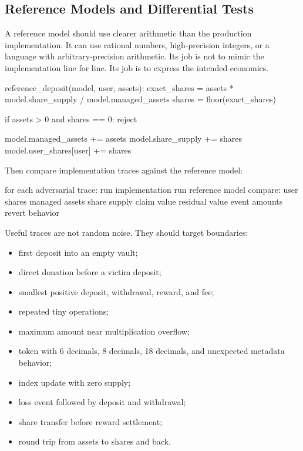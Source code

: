 \subsection{Reference Models and Differential Tests}

A reference model should use clearer arithmetic than the production implementation. It can use rational numbers, high-precision integers, or a language with arbitrary-precision arithmetic. Its job is not to mimic the implementation line for line. Its job is to express the intended economics.

\begin{codeblock}
reference_deposit(model, user, assets):
    exact_shares = assets * model.share_supply / model.managed_assets
    shares = floor(exact_shares)

    if assets > 0 and shares == 0:
        reject

    model.managed_assets += assets
    model.share_supply += shares
    model.user_shares[user] += shares
\end{codeblock}

Then compare implementation traces against the reference model:

\begin{codeblock}
for each adversarial trace:
    run implementation
    run reference model
    compare:
        user shares
        managed assets
        share supply
        claim value
        residual value
        event amounts
        revert behavior
\end{codeblock}

Useful traces are not random noise. They should target boundaries:

\begin{itemize}
\item first deposit into an empty vault;
\item direct donation before a victim deposit;
\item smallest positive deposit, withdrawal, reward, and fee;
\item repeated tiny operations;
\item maximum amount near multiplication overflow;
\item token with 6 decimals, 8 decimals, 18 decimals, and unexpected metadata behavior;
\item index update with zero supply;
\item loss event followed by deposit and withdrawal;
\item share transfer before reward settlement;
\item round trip from assets to shares and back.
\end{itemize}

